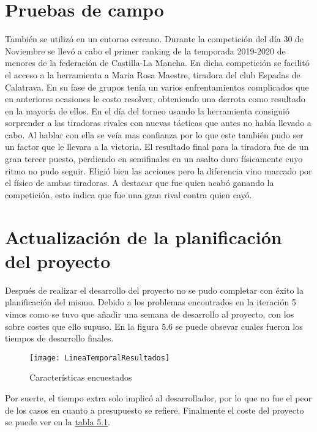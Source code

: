 \section{Pruebas de campo}
También se utilizó en un entorno cercano. Durante la competición del día 30 de Noviembre se llevó
a cabo el primer ranking de la temporada 2019-2020 de menores de la federación de Castilla-La Mancha.
En dicha competición se facilitó el acceso a la herramienta a Maria Rosa Maestre, tiradora del club
Espadas de Calatrava. En su fase de grupos tenía un varios enfrentamientos complicados que en anteriores
ocasiones le costo resolver, obteniendo una derrota como resultado en la mayoría de ellos. En el día
del torneo usando la herramienta consiguió sorprender a las tiradoras rivales con nuevas tácticas que
antes no había llevado a cabo. Al hablar con ella se veía mas confianza por lo que este también
pudo ser un factor que le llevara a la victoria. El resultado final para la tiradora fue de
un gran tercer puesto, perdiendo en semifinales en un asalto duro físicamente cuyo ritmo no pudo
seguir. Eligió bien las acciones pero la diferencia vino marcado por el físico de ambas tiradoras.
A destacar que fue quien acabó ganando la competición, esto indica que fue una gran rival contra
quien cayó.

\section{Actualización de la planificación del proyecto}
Después de realizar el desarrollo del proyecto no se pudo completar con éxito la planificación
del mismo. Debido a los problemas encontrados en la iteración 5 vimos como se tuvo que añadir
una semana de desarrollo al proyecto, con los sobre costes que ello supuso. En la figura 5.6
se puede obsevar cuales fueron los tiempos de desarrollo finales.

\begin{figure}[htb]
  \centering
  \texttt{[image: LineaTemporalResultados]}
  \caption[Características encuestados]{Características encuestados}
  \label{fig:Características encuestados}
\end{figure}

Por suerte, el tiempo extra solo implicó al desarrollador, por lo que no fue el peor de los
casos en cuanto a presupuesto se refiere. Finalmente el coste del proyecto se puede ver en
la \hyperref[tab:costes actualizados del proyecto]{tabla 5.1}.

